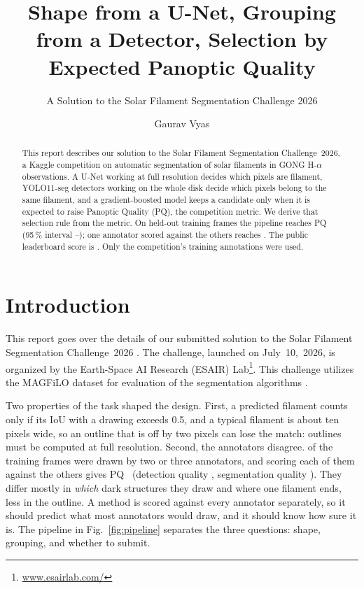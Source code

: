 \documentclass[sigconf]{acmart}
\begin{document}
\title{Shape from a U-Net, Grouping from a Detector, Selection by Expected Panoptic Quality}
\subtitle{A Solution to the Solar Filament Segmentation Challenge 2026} %

\author{Gaurav Vyas}

\begin{abstract}
    This report describes our solution to the Solar Filament Segmentation Challenge~2026, a Kaggle competition on automatic segmentation of solar filaments in GONG H-$\alpha$ observations. A U-Net working at full resolution decides which pixels are filament, YOLO11-seg detectors working on the whole disk decide which pixels belong to the same filament, and a gradient-boosted model keeps a candidate only when it is expected to raise Panoptic Quality (PQ), the competition metric. We derive that selection rule from the metric. On held-out training frames the pipeline reaches PQ~\pqAll{} (95\,\% interval \pqAllLow{}--\pqAllHigh{}); one annotator scored against the others reaches \pqHuman{}. The public leaderboard score is \pqPublic{}. Only the competition's training annotations were used.
\end{abstract}

\maketitle

\section{Introduction}
    This report goes over the details of our submitted solution to the Solar Filament Segmentation Challenge~2026 \cite{filament-segmentation-2026}. The challenge, launched on July~10,~2026, is organized by the Earth-Space AI Research (ESAIR) Lab\footnote{\href{https://www.esairlab.com/}{www.esairlab.com/}}. This challenge utilizes the MAGFiLO dataset for evaluation of the segmentation algorithms \cite{ahmadzadeh2024dataset}.

    Two properties of the task shaped the design. First, a predicted filament counts only if its IoU with a drawing exceeds 0.5, and a typical filament is about ten pixels wide, so an outline that is off by two pixels can lose the match: outlines must be computed at full resolution. Second, the annotators disagree. \nMulti{} of the \nFrames{} training frames were drawn by two or three annotators, and scoring each of them against the others gives PQ~\pqHuman{} (detection quality \dqHuman{}, segmentation quality \sqHuman{}). They differ mostly in \emph{which} dark structures they draw and where one filament ends, less in the outline. A method is scored against every annotator separately, so it should predict what most annotators would draw, and it should know how sure it is. The pipeline in Fig.~\ref{fig:pipeline} separates the three questions: shape, grouping, and whether to submit.
\end{document}
